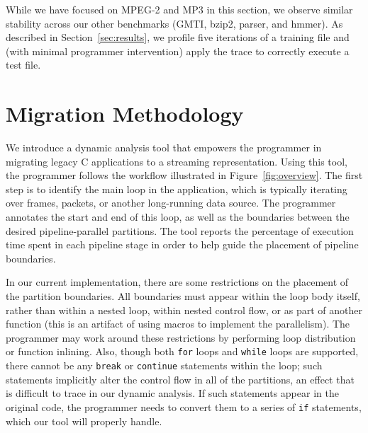 % 

While we have focused on MPEG-2 and MP3 in this section, we observe
similar stability across our other benchmarks (GMTI, bzip2, parser,
and hmmer).  As described in Section~\ref{sec:results}, we profile
five iterations of a training file and (with minimal programmer
intervention) apply the trace to correctly execute a test file.

\section{Migration Methodology}
\label{sec:workflow}

\enlargethispage{0.5\baselineskip}
We introduce a dynamic analysis tool that empowers the programmer in
migrating legacy C applications to a streaming representation.  Using
this tool, the programmer follows the workflow illustrated in
Figure~\ref{fig:overview}.  The first step is to identify the main
loop in the application, which is typically iterating over frames,
packets, or another long-running data source.  The programmer
annotates the start and end of this loop, as well as the boundaries
between the desired pipeline-parallel partitions.  The tool reports
the percentage of execution time spent in each pipeline stage in order
to help guide the placement of pipeline boundaries.

In our current implementation, there are some restrictions on the
placement of the partition boundaries.  All boundaries must appear
within the loop body itself, rather than within a nested loop, within
nested control flow, or as part of another function (this is an
artifact of using macros to implement the parallelism).  The
programmer may work around these restrictions by performing loop
distribution or function inlining.  Also, though both {\tt for} loops
and {\tt while} loops are supported, there cannot be any {\tt break}
or {\tt continue} statements within the loop; such statements
implicitly alter the control flow in all of the partitions, an effect
that is difficult to trace in our dynamic analysis.  If such
statements appear in the original code, the programmer needs to
convert them to a series of {\tt if} statements, which our tool will
properly handle.

